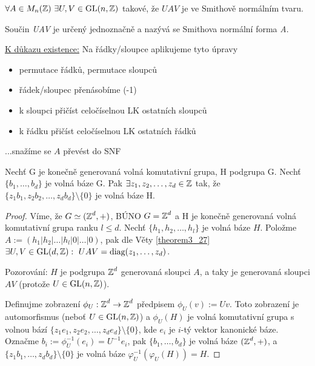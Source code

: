 \begin{theorem}\label{theorem3_27}
$\forall A\in M_n(\operatorname{\mathbb{Z}})\ \exists U,V\in \operatorname{GL}(n,\operatorname{\mathbb{Z}})$ takové, že $UAV$ je ve Smithově normálním tvaru.
\end{theorem}

\begin{definition}
Součin \emph{UAV} je určený jednoznačně a nazývá se Smithova normální forma \emph{A}.
\end{definition}

\underline{K důkazu existence:} Na řádky/sloupce aplikujeme tyto úpravy
\begin{itemize}
    \item permutace řádků, permutace sloupců
    \item řádek/sloupec přenásobíme (-1)
    \item k sloupci přičíst celočíselnou LK ostatních sloupců
    \item k řádku přičíst celočíselnou LK ostatních řádků
\end{itemize}
...snažíme se $A$ převést do SNF

\begin{theorem}
Nechť G je konečně generovaná volná komutativní grupa, H podgrupa G. Nechť $\{b_1,\ldots,b_d\}$ je volná báze G. Pak $\exists z_1,z_2,\ldots,z_d\in \operatorname{\mathbb{Z}}$ tak, že $\{z_1b_1,z_2b_2,\ldots,z_d b_d\}\setminus\{0\}$ je volná báze H.
\end{theorem}

\begin{proof}
Víme, že $G\simeq(\operatorname{\mathbb{Z}}^d,+)$, BÚNO $G=\operatorname{\mathbb{Z}}^d$ a H je konečně generovaná volná komutativní grupa ranku $l \leq d$. Nechť $\{h_1,h_2,\ldots,h_l\}$ je volná báze $H$. Položme $A:=(h_1|h_2|\ldots|h_l|0|\ldots|0)$, pak dle Věty \ref{theorem3_27} $\exists U,V \in \GL(d,\Z): \ UAV=\text{diag}(z_1,\ldots,z_d)$.

Pozorování: $H$ je podgrupa $\operatorname{\mathbb{Z}}^d$ generovaná sloupci $A$, a taky je generovaná sloupci $AV$ (protože $U \in \operatorname{GL}(n,\operatorname{\mathbb{Z}})$).

Definujme zobrazení $\phi_U:\operatorname{\mathbb{Z}}^d\rightarrow\operatorname{\mathbb{Z}}^d$ předpisem $\phi_U(v):=Uv$. Toto zobrazení je automorfismus (neboť $U \in \operatorname{GL}(n,\operatorname{\mathbb{Z}})$) a $\phi_U (H)$ je volná komutativní grupa s volnou bází $\{z_1e_1,z_2e_2,\ldots,z_de_d\}\setminus\{0\}$, kde $e_i$ je $i$-tý vektor kanonické báze. Označme $b_i:=\phi_U^{-1}(e_i)=U^{-1}e_i$, pak
$\{b_1,\ldots,b_d\}$ je volná báze $(\operatorname{\mathbb{Z}}^d,+)$, a $\{z_1b_1, \ldots,z_d b_d\}\setminus\{0\}$ je volná báze $\varphi_U^{-1}(\varphi_U(H))=H$.
\end{proof}
